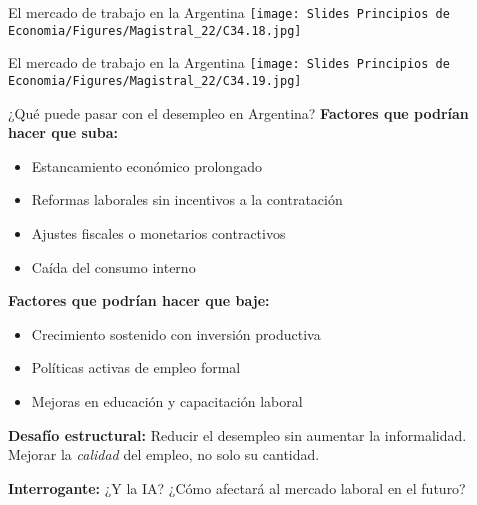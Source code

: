 \documentclass{beamer}
\begin{document}
\begin{frame}{El mercado de trabajo en la Argentina}
\centering\texttt{[image: Slides Principios de Economia/Figures/Magistral\_22/C34.18.jpg]}
\end{frame}

\begin{frame}{El mercado de trabajo en la Argentina}
\centering\texttt{[image: Slides Principios de Economia/Figures/Magistral\_22/C34.19.jpg]}
\end{frame}

\begin{frame}{¿Qué puede pasar con el desempleo en Argentina?}
    \small
    \textbf{Factores que podrían hacer que suba:}
    \begin{itemize}
        \item Estancamiento económico prolongado
        \item Reformas laborales sin incentivos a la contratación
        \item Ajustes fiscales o monetarios contractivos
        \item Caída del consumo interno
    \end{itemize}
    \vspace{0.15cm}
    \textbf{Factores que podrían hacer que baje:}
    \begin{itemize}
        \item Crecimiento sostenido con inversión productiva
        \item Políticas activas de empleo formal
        \item Mejoras en educación y capacitación laboral
    \end{itemize}
    \vspace{0.15cm}
    \textbf{Desafío estructural:}  
    Reducir el desempleo sin aumentar la informalidad. Mejorar la \textit{calidad} del empleo, no solo su cantidad.

    \vspace{0.15cm}
    \textbf{Interrogante:} ¿Y la IA? ¿Cómo afectará al mercado laboral en el futuro?
\end{frame}
\end{document}
